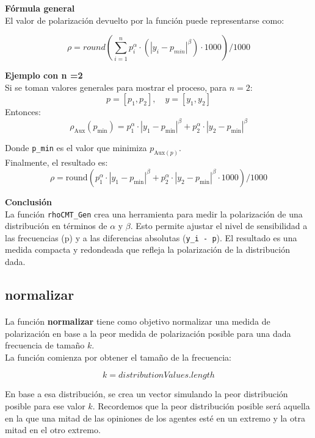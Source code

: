 \documentclass{article}
\begin{document}
	\textbf{Fórmula general}\\
	El valor de polarización devuelto por la función puede representarse como:
	
	\[
	\rho = round (\sum_{i=1}^n p_i^\alpha \cdot ( |y_i - p_{min}|^\beta) \cdot 1000) /1000
	\]  

	\textbf{Ejemplo con n =2}\\
	
	Si se toman valores generales para mostrar el proceso, para $n = 2$:  
	\[
	p = [p_1, p_2], \quad y = [y_1, y_2]
	\]  
	Entonces:  
	\[
	\rho_{\text{Aux}}(p_{\text{min}}) = p_1^\alpha \cdot |y_1 - p_{\text{min}}|^\beta + p_2^\alpha \cdot |y_2 - p_{\text{min}}|^\beta
	\]  
	
	Donde \texttt{p\_min} es el valor que minimiza $p_{\text{Aux}(p)}$. \\
	Finalmente, el resultado es:
	\[
	\rho = \text{round}\left(p_1^\alpha \cdot |y_1 - p_{\text{min}}|^\beta + p_2^\alpha \cdot |y_2 - p_{\text{min}}|^\beta \cdot 1000\right) / 1000
	\]  
	
	\textbf{Conclusión}\\

	La función \texttt{rhoCMT\_Gen} crea una herramienta para medir la polarización de una distribución en términos de $\alpha$ y $\beta$. Esto permite ajustar el nivel de sensibilidad a las frecuencias (p) y a las diferencias absolutas (\texttt{y\_i - p}). El resultado es una medida compacta y redondeada que refleja la polarización de la distribución dada.

    \subsection{normalizar}

    \paragraph{}
    La función \textbf{normalizar} tiene como objetivo normalizar una medida de polarización en base a la peor medida de polarización posible para una dada frecuencia de tamaño $k$.
    \\

    La función comienza por obtener el tamaño de la frecuencia:

    \[k = distributionValues.length\]

    En base a esa distribución, se crea un vector simulando la peor distribución posible para ese valor $k$. Recordemos que la peor distribución posible será aquella en la que una mitad de las opiniones de los agentes esté en un extremo y la otra mitad en el otro extremo.
\end{document}
